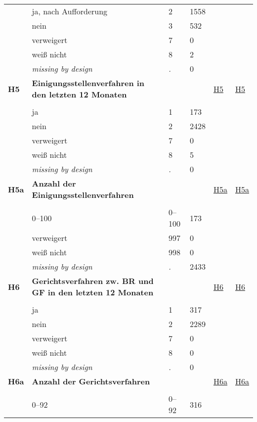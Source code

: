 \begin{longtable}{| L{2.45cm} | L{6cm} | C{1.5cm} | R{1cm} | C{2.25cm} | C{2.25cm} |}
   & ja, nach Aufforderung & 2 & 1558 &  &  \\ 
   & nein & 3 & 532 &  &  \\ 
   & verweigert & 7 & 0 &  &  \\ 
   & weiß nicht & 8 & 2 &  &  \\ 
   & \textit{missing by design} & \textit{.} & 0 &  &  \\ 
   \midrule
\textbf{H5}\label{var:H5} & \textbf{Einigungsstellenverfahren in den letzten 12 Monaten} &  &  & \hyperref[H5]{H5} & \hyperref[var:suf:H5]{H5} \\ 
   &  &  &  &  &  \\ 
   & ja & 1 & 173 &  &  \\ 
   & nein & 2 & 2428 &  &  \\ 
   & verweigert & 7 & 0 &  &  \\ 
   & weiß nicht & 8 & 5 &  &  \\ 
   & \textit{missing by design} & \textit{.} & 0 &  &  \\ 
   \midrule
\textbf{H5a}\label{var:H5a} & \textbf{Anzahl der Einigungsstellenverfahren} &  &  & \hyperref[H5a]{H5a} & \hyperref[var:suf:H5a]{H5a} \\ 
   &  &  &  &  &  \\ 
   & 0--100 & 0--100 & 173 &  &  \\ 
   & verweigert & 997 & 0 &  &  \\ 
   & weiß nicht & 998 & 0 &  &  \\ 
   & \textit{missing by design} & \textit{.} & 2433 &  &  \\ 
   \midrule
\textbf{H6}\label{var:H6} & \textbf{Gerichtsverfahren zw. BR und GF in den letzten 12 Monaten} &  &  & \hyperref[H6]{H6} & \hyperref[var:suf:H6]{H6} \\ 
   &  &  &  &  &  \\ 
   & ja & 1 & 317 &  &  \\ 
   & nein & 2 & 2289 &  &  \\ 
   & verweigert & 7 & 0 &  &  \\ 
   & weiß nicht & 8 & 0 &  &  \\ 
   & \textit{missing by design} & \textit{.} & 0 &  &  \\ 
   \midrule
\textbf{H6a}\label{var:H6a} & \textbf{Anzahl der Gerichtsverfahren} &  &  & \hyperref[H6a]{H6a} & \hyperref[var:suf:H6a]{H6a} \\ 
   &  &  &  &  &  \\ 
   & 0--92 & 0--92 & 316 &  &  \\ 

\end{longtable}
